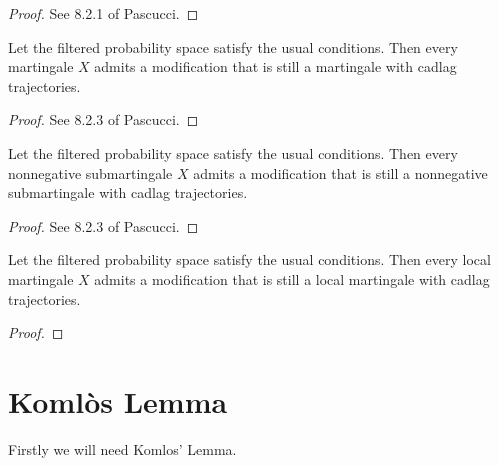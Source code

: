 \begin{proof}
  See 8.2.1 of Pascucci.
\end{proof}


\begin{lemma}\label{lem:mg_is_cadlag}
  Let the filtered probability space satisfy the usual conditions.
  Then every martingale $X$ admits a modification that is still a martingale with cadlag trajectories.
\end{lemma}

\begin{proof}
  See 8.2.3 of Pascucci.
\end{proof}


\begin{lemma}\label{lem:exists_cadlag_mod_of_nonneg_submg}
  Let the filtered probability space satisfy the usual conditions.
  Then every nonnegative submartingale $X$ admits a modification that is still a nonnegative submartingale with cadlag trajectories.
\end{lemma}

\begin{proof}
  See 8.2.3 of Pascucci.
\end{proof}


\begin{lemma}\label{lem:exists_cadlag_mod_of_local_mg}
  Let the filtered probability space satisfy the usual conditions.
  Then every local martingale $X$ admits a modification that is still a local martingale with cadlag trajectories.
\end{lemma}

\begin{proof}
\end{proof}



\section{Komlòs Lemma}



Firstly we will need Komlos' Lemma.


